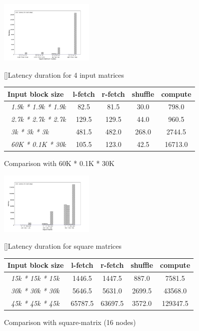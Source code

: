 \documentclass[10pt, conference, compsocconf]{IEEEtran}
\begin{document}
\begin{figure}[htp]
	\centering
	\includegraphics[width=0.4\textwidth]{figures/r4-2xl-square.pdf}\caption{\label{fig:square-non-square}Comparison with 60K * 0.1K * 30K}
	[]{Latency duration for 4 input matrices }\label{tab:square-non-square-table}
	\setlength\tabcolsep{5pt}
	\begin{tabular}{lcccc}
    \toprule
    \multirow{1}{*}{Input block size} &
      \multicolumn{1}{c}{l-fetch} &
      \multicolumn{1}{c}{r-fetch} &
      \multicolumn{1}{c}{shuffle } &
      \multicolumn{1}{c}{compute } \\
      \midrule
    ~\textit{1.9k * 1.9k * 1.9k} & 82.5 & 81.5 & 30.0 & 798.0  \\
    ~\textit{2.7k * 2.7k * 2.7k} & 129.5 & 129.5 & 44.0 & 960.5  \\
    ~\textit{3k * 3k * 3k} & 481.5 & 482.0 & 268.0 & 2744.5 \\
    ~\textit{60K * 0.1K * 30k} & 105.5 & 123.0 & 42.5 & 16713.0
    \\
    \bottomrule
  \end{tabular}
\end{figure}


\begin{figure}[htp]
	\centering
	\includegraphics[width=0.4\textwidth]{figures/r4-2xl-square-scaling-16nodes.pdf}\caption{\label{fig:square-non-square}Comparison with square-matrix (16 nodes)}
	[]{Latency duration for square matrices }\label{tab:square-non-square-table}
	\setlength\tabcolsep{5pt}
	\begin{tabular}{lcccc}
    \toprule
    \multirow{1}{*}{Input block size} &
      \multicolumn{1}{c}{l-fetch} &
      \multicolumn{1}{c}{r-fetch} &
      \multicolumn{1}{c}{shuffle } &
      \multicolumn{1}{c}{compute } \\
      \midrule
    ~\textit{15k * 15k * 15k} &  1446.5 &  1447.5  & 887.0   & 7581.5 \\
    ~\textit{30k * 30k * 30k} &  5646.5 &  5631.0 & 2699.5  & 43568.0 \\
    ~\textit{45k * 45k * 45k} & 65787.5 & 63697.5 & 3572.0 & 129347.5\\
    \bottomrule
  \end{tabular}
\end{figure}
\end{document}
